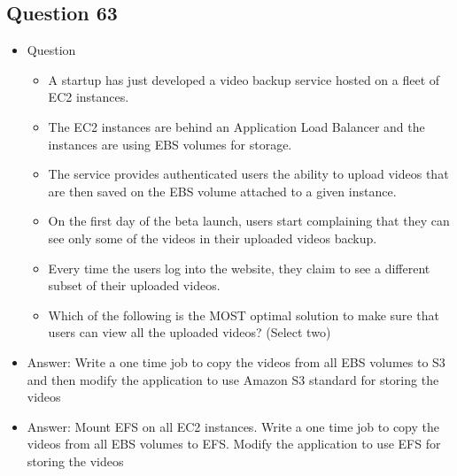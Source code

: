 \documentclass[]{scrartcl}
\begin{document}
\subsection{Question 63}
\begin{itemize}
	\item Question
	\begin{itemize}
		\item A startup has just developed a video backup service hosted on a fleet of EC2 instances. 
		\item The EC2 instances are behind an Application Load Balancer and the instances are using EBS volumes for storage. 
		\item The service provides authenticated users the ability to upload videos that are then saved on the EBS volume attached to a given instance. 
		\item On the first day of the beta launch, users start complaining that they can see only some of the videos in their uploaded videos backup. 
		\item Every time the users log into the website, they claim to see a different subset of their uploaded videos.
		\item Which of the following is the MOST optimal solution to make sure that users can view all the uploaded videos? (Select two)
	\end{itemize}
	\item Answer: Write a one time job to copy the videos from all EBS volumes to S3 and then modify the application to use Amazon S3 standard for storing the videos
	\item Answer: Mount EFS on all EC2 instances. Write a one time job to copy the videos from all EBS volumes to EFS. Modify the application to use EFS for storing the videos
\end{itemize}
\end{document}
